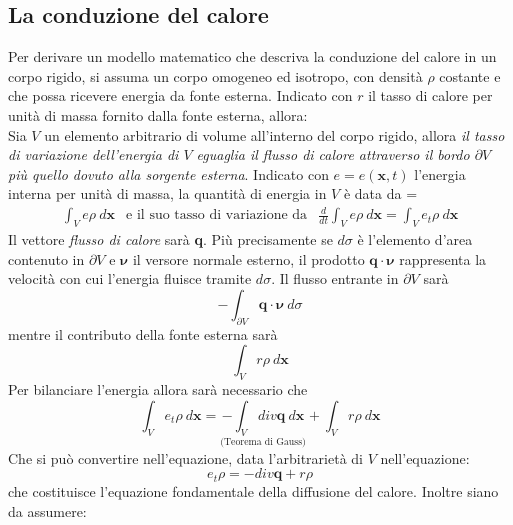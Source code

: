 \documentclass[a4paper,12pt, draft]{article}
\theoremstyle{break}
\numberwithin{equation}{section}
\begin{document}
\subsection{La conduzione del calore}
Per derivare un modello matematico che descriva la conduzione del calore in un corpo rigido, si assuma un corpo omogeneo ed isotropo, con densità $\rho$ costante e che possa ricevere energia da fonte esterna. Indicato con $r$ il tasso di calore per unità di massa fornito dalla fonte esterna, allora: \\
Sia $V$ un elemento arbitrario di volume all'interno del corpo rigido, allora \emph{il tasso di variazione dell'energia di $V$ eguaglia il flusso di calore attraverso il bordo $\partial V$ più quello dovuto alla sorgente esterna}.  
Indicato con $e = e(\bm{x}, t)$ l'energia interna per unità di massa, la quantità di energia in $V$ è data da 
{
\everymath = {\displaystyle}
$$
\begin{array}{lcr}


\int_V e \rho \  d\bm{x} & \mbox{e il suo tasso di variazione da} &
\frac{d}{dt}\int_V e\rho \ d\bm{x} = \int_V e_t \rho \ d\bm{x}
\end{array}
$$
}
Il vettore \emph{flusso di calore}  sarà \textbf{q}. Più precisamente se $d\sigma$ è l'elemento d'area contenuto in $\partial V$ e $\boldsymbol{\nu}$ il versore normale esterno, il prodotto $\mathbf{q} \cdot \boldsymbol{\nu}$ rappresenta la velocità con cui l'energia fluisce tramite $d\sigma$. Il flusso entrante in $\partial V$ sarà 
$$
-\int_{\partial V} \mathbf{q}\cdot \boldsymbol{\nu} \ d\sigma 
$$
mentre il contributo della fonte esterna sarà
$$\int_V r\rho \ d\bm{x}$$
Per bilanciare l'energia allora sarà necessario che 
\begin{equation}
\int_V e_t\rho \ d\bm{x} = \underset{\mbox{(Teorema di Gauss)}}{-\int_V div\mathbf{q} \ d\bm{x}} + \int_{V} r \rho \ d\bm{x}
\end{equation}
Che si può convertire nell'equazione, data l'arbitrarietà di $V$ nell'equazione:
\begin{equation}
e_t \rho = - div\mathbf{q} + r\rho
\end{equation}
che costituisce l'equazione fondamentale della diffusione del calore.
Inoltre siano da assumere:
\end{document}
